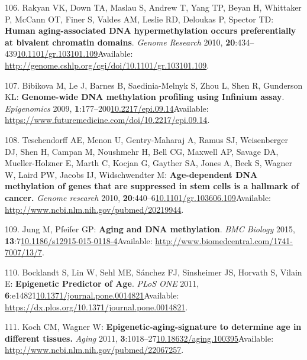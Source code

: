 \documentclass[
]{book}
\begin{document}
\leavevmode\hypertarget{ref-Rakyan2010}{}%
106. Rakyan VK, Down TA, Maslau S, Andrew T, Yang TP, Beyan H, Whittaker P, McCann OT, Finer S, Valdes AM, Leslie RD, Deloukas P, Spector TD: \textbf{Human aging-associated DNA hypermethylation occurs preferentially at bivalent chromatin domains}. \emph{Genome Research} 2010, \textbf{20}:434--439\href{https://doi.org/10.1101/gr.103101.109}{10.1101/gr.103101.109}Available: \url{http://genome.cshlp.org/cgi/doi/10.1101/gr.103101.109}.

\leavevmode\hypertarget{ref-Bibikova2009}{}%
107. Bibikova M, Le J, Barnes B, Saedinia-Melnyk S, Zhou L, Shen R, Gunderson KL: \textbf{Genome-wide DNA methylation profiling using Infinium assay}. \emph{Epigenomics} 2009, \textbf{1}:177--200\href{https://doi.org/10.2217/epi.09.14}{10.2217/epi.09.14}Available: \url{https://www.futuremedicine.com/doi/10.2217/epi.09.14}.

\leavevmode\hypertarget{ref-Teschendorff2010}{}%
108. Teschendorff AE, Menon U, Gentry-Maharaj A, Ramus SJ, Weisenberger DJ, Shen H, Campan M, Noushmehr H, Bell CG, Maxwell AP, Savage DA, Mueller-Holzner E, Marth C, Kocjan G, Gayther SA, Jones A, Beck S, Wagner W, Laird PW, Jacobs IJ, Widschwendter M: \textbf{Age-dependent DNA methylation of genes that are suppressed in stem cells is a hallmark of cancer.} \emph{Genome research} 2010, \textbf{20}:440--6\href{https://doi.org/10.1101/gr.103606.109}{10.1101/gr.103606.109}Available: \url{http://www.ncbi.nlm.nih.gov/pubmed/20219944}.

\leavevmode\hypertarget{ref-Jung2015}{}%
109. Jung M, Pfeifer GP: \textbf{Aging and DNA methylation}. \emph{BMC Biology} 2015, \textbf{13}:7\href{https://doi.org/10.1186/s12915-015-0118-4}{10.1186/s12915-015-0118-4}Available: \url{http://www.biomedcentral.com/1741-7007/13/7}.

\leavevmode\hypertarget{ref-Bocklandt2011}{}%
110. Bocklandt S, Lin W, Sehl ME, Sánchez FJ, Sinsheimer JS, Horvath S, Vilain E: \textbf{Epigenetic Predictor of Age}. \emph{PLoS ONE} 2011, \textbf{6}:e14821\href{https://doi.org/10.1371/journal.pone.0014821}{10.1371/journal.pone.0014821}Available: \url{https://dx.plos.org/10.1371/journal.pone.0014821}.

\leavevmode\hypertarget{ref-Koch2011}{}%
111. Koch CM, Wagner W: \textbf{Epigenetic-aging-signature to determine age in different tissues.} \emph{Aging} 2011, \textbf{3}:1018--27\href{https://doi.org/10.18632/aging.100395}{10.18632/aging.100395}Available: \url{http://www.ncbi.nlm.nih.gov/pubmed/22067257}.
\end{document}
